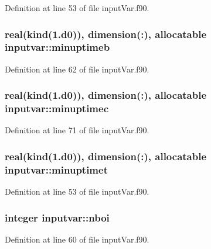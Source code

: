 Definition at line 53 of file input\-Var.\-f90.

\hypertarget{classinputvar_a84de543a9e5ef22ff5f0fc9e0cce8b32}{
\subsubsection[{minuptimeb}]{\setlength{\rightskip}{0pt plus 5cm}real(kind(1.d0)), dimension(\-:), allocatable inputvar\-::minuptimeb}}\label{classinputvar_a84de543a9e5ef22ff5f0fc9e0cce8b32}


Definition at line 62 of file input\-Var.\-f90.

\hypertarget{classinputvar_a86ea15836ba0fabd0de2d5bb9ee52cc1}{
\subsubsection[{minuptimec}]{\setlength{\rightskip}{0pt plus 5cm}real(kind(1.d0)), dimension(\-:), allocatable inputvar\-::minuptimec}}\label{classinputvar_a86ea15836ba0fabd0de2d5bb9ee52cc1}


Definition at line 71 of file input\-Var.\-f90.

\hypertarget{classinputvar_a1e617330959313dade0696c66ae235cf}{
\subsubsection[{minuptimet}]{\setlength{\rightskip}{0pt plus 5cm}real(kind(1.d0)), dimension(\-:), allocatable inputvar\-::minuptimet}}\label{classinputvar_a1e617330959313dade0696c66ae235cf}


Definition at line 53 of file input\-Var.\-f90.

\hypertarget{classinputvar_a168bc1dcb73e68b3620991b6494f3797}{
\subsubsection[{nboi}]{\setlength{\rightskip}{0pt plus 5cm}integer inputvar\-::nboi}}\label{classinputvar_a168bc1dcb73e68b3620991b6494f3797}


Definition at line 60 of file input\-Var.\-f90.

